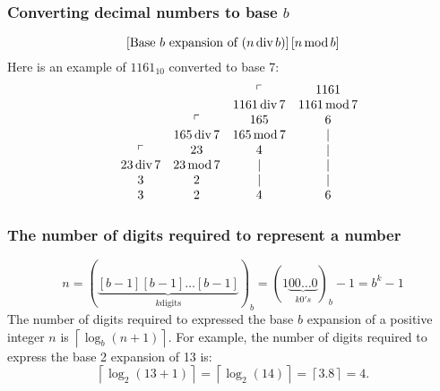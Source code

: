\subsubsection*{Converting decimal numbers to base $b$}
\[
  \left[\text{Base $b$ expansion of $(n \operatorname{\text{div}} b)$}\right]\left[n \operatorname{\text{mod}} b\right]
\]
Here is an example of $1161_{10}$ converted to base 7:
\[
  \begin{array}{ccccc}
     &            &             & \ulcorner    & 1161         \\
     &            &             & 1161 \operatorname{\text{div}} 7 & 1161 \operatorname{\text{mod}} 7 \\
     &            & \ulcorner   & 165          & 6            \\
     &            & 165 \operatorname{\text{div}} 7 & 165 \operatorname{\text{mod}} 7  & |            \\
     & \ulcorner  & 23          & 4            & |            \\
     & 23 \operatorname{\text{div}} 7 & 23 \operatorname{\text{mod}} 7  & |            & |            \\
     & 3          & 2           & |            & |            \\
     & 3          & 2           & 4            & 6            \\
  \end{array}
\]

\subsubsection*{The number of digits required to represent a number}
\[
  n = (\underbrace{[b-1][b-1]\ldots[b-1]}_{k \text{digits}})_b = (1\underbrace{00\ldots 0}_{k 0's})_b -1 = b^k - 1
\]
The number of digits required to expressed the base $b$ expansion of a positive integer $n$ is $\left\lceil \log_b (n+1) \right\rceil$. For example, the number of digits required to express the base 2 expansion of 13 is:
\[
  \left\lceil\log_2 (13 + 1)\right\rceil = \left\lceil \log_2(14)\right\rceil = \left\lceil 3.8 \right\rceil = 4.
\]

